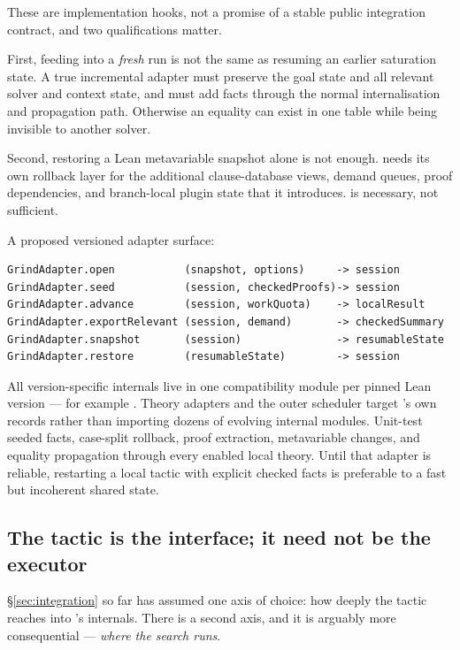 These are implementation hooks, not a promise of a stable public integration
contract, and two qualifications matter.

First, feeding  into a \emph{fresh} run is not the same
as resuming an earlier saturation state. A true incremental adapter must
preserve the goal state and all relevant solver and context state, and must add
facts through the normal internalisation and propagation path. Otherwise an
equality can exist in one table while being invisible to another solver.

Second, restoring a Lean metavariable snapshot alone is not enough.
\forge{} needs its own rollback layer for the additional clause-database views,
demand queues, proof dependencies, and branch-local plugin state that it
introduces.  is necessary, not sufficient.

A proposed versioned adapter surface:

\begin{lstlisting}
GrindAdapter.open           (snapshot, options)     -> session
GrindAdapter.seed           (session, checkedProofs)-> session
GrindAdapter.advance        (session, workQuota)    -> localResult
GrindAdapter.exportRelevant (session, demand)       -> checkedSummary
GrindAdapter.snapshot       (session)               -> resumableState
GrindAdapter.restore        (resumableState)        -> session
\end{lstlisting}

All version-specific internals live in one compatibility module per pinned Lean
version --- for example . Theory adapters and the
outer scheduler target \forge{}'s own records rather than importing dozens of
evolving internal modules. Unit-test seeded facts, case-split rollback, proof
extraction, metavariable changes, and equality propagation through every enabled
local theory. Until that adapter is reliable, restarting a local tactic with
explicit checked facts is preferable to a fast but incoherent shared state.

\subsection{The tactic is the interface; it need not be the executor}
\label{sec:worker-split}

\S\ref{sec:integration} so far has assumed one axis of choice: how deeply the
tactic reaches into \grind{}'s internals. There is a second axis, and it is
arguably more consequential --- \emph{where the search runs}.

